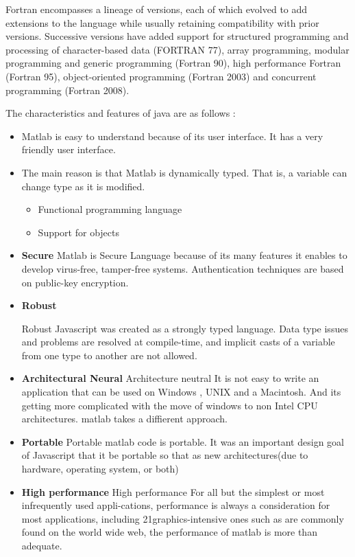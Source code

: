 Fortran encompasses a lineage of versions, each of which evolved to add extensions to the language while usually retaining compatibility with prior versions. Successive versions have added support for structured programming and processing of character-based data (FORTRAN 77), array programming, modular programming and generic programming (Fortran 90), high performance Fortran (Fortran 95), object-oriented programming (Fortran 2003) and concurrent programming (Fortran 2008).

The characteristics and features of java are as follows :

\begin{itemize}
	\item 

Matlab is easy to understand because of its user interface. It has a very friendly user interface.  


\item The main reason is that Matlab is dynamically typed. That is, a variable can change type as it is modified.


\begin{itemize}
	\item Functional programming language
	
\item Support for objects

\end{itemize}

\item \textbf{Secure}
Matlab is Secure Language because of its many features it enables to
develop virus-free, tamper-free systems. Authentication techniques are
based on public-key encryption.

\item \textbf{Robust}

Robust Javascript was created as a strongly typed language. Data type issues
and problems are resolved at compile-time, and implicit casts of a variable
from one type to another are not allowed.

\item \textbf{Architectural Neural}
Architecture neutral It is not easy to write an application that can be used
on Windows , UNIX and a Macintosh. And its getting more complicated
with the move of windows to non Intel CPU architectures.
matlab takes a diffierent approach. 
\item \textbf{Portable}
Portable matlab code is portable. It was an important design goal of Javascript that it
be portable so that as new architectures(due to hardware, operating system,
or both)

\item \textbf{High performance}
High performance For all but the simplest or most infrequently used appli-cations,
performance is always a consideration for most applications, including
21graphics-intensive ones such as are commonly found on the world wide web,
the performance of matlab is more than adequate.



\end{itemize}

